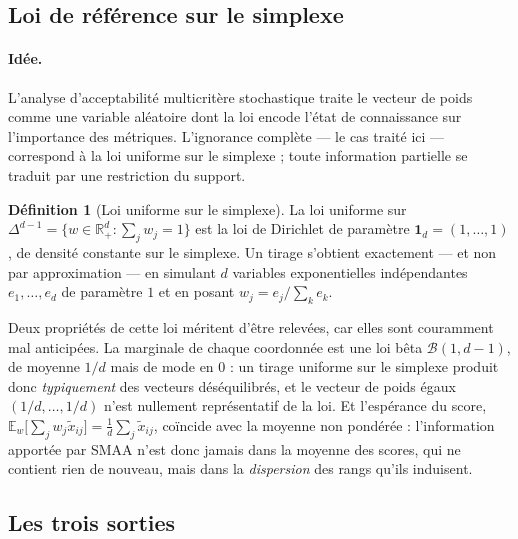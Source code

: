 \documentclass[11pt,a4paper]{article}
\theoremstyle{definition}
\newtheorem{definition}{Définition}[section]
\theoremstyle{remark}
\newcommand{\R}{\mathbb{R}}
\newcommand{\EE}{\mathbb{E}}
\newcommand{\simplex}{\Delta^{d-1}}
\begin{document}
\bigskip

\subsection{Loi de référence sur le simplexe}
\label{sec:smaa-loi}

\medskip

\paragraph{Idée.} L'analyse d'acceptabilité multicritère stochastique \citep[SMAA,][]
{lahdelma1998} traite le vecteur de poids comme une variable aléatoire dont la loi encode
l'état de connaissance sur l'importance des métriques. L'ignorance complète --- le cas
traité ici --- correspond à la loi uniforme sur le simplexe ; toute information partielle
se traduit par une restriction du support.

\medskip

\begin{definition}[Loi uniforme sur le simplexe]
  \label{def:dirichlet}
  La loi uniforme sur $\simplex = \{w \in \R^d_+ : \sum_j w_j = 1\}$ est la loi de
  Dirichlet de paramètre $\mathbf{1}_d = (1,\dots,1)$, de densité constante sur le
  simplexe. Un tirage s'obtient exactement --- et non par approximation --- en simulant
  $d$ variables exponentielles indépendantes $e_1,\dots,e_d$ de paramètre $1$ et en
  posant $w_j = e_j / \sum_k e_k$.
\end{definition}

\bigskip

Deux propriétés de cette loi méritent d'être relevées, car elles sont couramment mal
anticipées. La marginale de chaque coordonnée est une loi bêta $\mathcal{B}(1, d-1)$, de
moyenne $1/d$ mais de mode en $0$ : un tirage uniforme sur le simplexe produit donc
\emph{typiquement} des vecteurs déséquilibrés, et le vecteur de poids égaux $(1/d,\dots,
1/d)$ n'est nullement représentatif de la loi. Et l'espérance du score,
$\EE_w\big[\sum_j w_j \tilde{x}_{ij}\big] = \frac{1}{d}\sum_j \tilde{x}_{ij}$, coïncide
avec la moyenne non pondérée : l'information apportée par SMAA n'est donc jamais dans la
moyenne des scores, qui ne contient rien de nouveau, mais dans la \emph{dispersion} des
rangs qu'ils induisent.

\bigskip

\subsection{Les trois sorties}
\label{sec:smaa-sorties}
\end{document}
